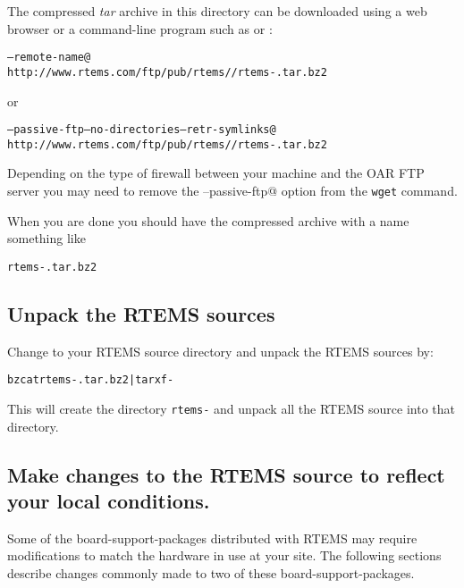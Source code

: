 \documentclass{report}
\begin{document}
The compressed {\it tar} archive in this directory can be downloaded using a web browser or a command-line program such as \verb@curl@ or \verb@wget@:
{\small
\begin{alltt}
\verb@curl --remote-name@
\hspace{0.2in}http://www.rtems.com/ftp/pub/rtems/\rtemsVersion/rtems-\rtemsVersion.tar.bz2
\end{alltt}
or
\begin{alltt}
\verb@wget --passive-ftp --no-directories --retr-symlinks@
\hspace{0.2in}http://www.rtems.com/ftp/pub/rtems/\rtemsVersion/rtems-\rtemsVersion.tar.bz2
\end{alltt}
}
Depending on the type of firewall between your machine and the OAR FTP server
you may need to remove the \verb@--passive-ftp@ option from the {\tt wget} command.


When you are done you should have the compressed archive with a name something like
\begin{alltt}
rtems-\rtemsVersion.tar.bz2
\end{alltt}

\subsection {Unpack the RTEMS sources}
Change to your RTEMS source directory and unpack the RTEMS sources by:
\begin{alltt}
bzcat rtems-\rtemsVersion.tar.bz2 | tar xf -
\end{alltt}
This will create the directory {\tt rtems-\rtemsVersion} 
and unpack all the RTEMS source into that directory.

\subsection {Make changes to the RTEMS source to reflect your local conditions.}
Some of the board-support-packages distributed with RTEMS may require
modifications to match the hardware in use at your site.  The following 
sections describe changes commonly made to two of these board-support-packages.
\end{document}
